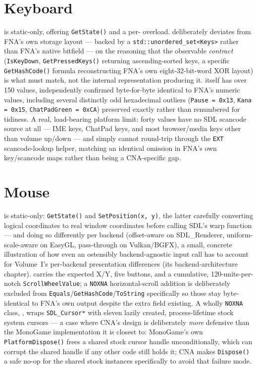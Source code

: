 \section{Keyboard}

 is static-only, offering \texttt{GetState()} and a
per- overload.  deliberately deviates from
FNA's own storage layout --- backed by a \texttt{std::unordered\_set<Keys>} rather than
FNA's native bitfield --- on the reasoning that the observable \emph{contract}
(\texttt{IsKeyDown}, \texttt{GetPressedKeys()} returning ascending-sorted keys, a specific
\texttt{GetHashCode()} formula reconstructing FNA's own eight-32-bit-word XOR layout) is what
must match, not the internal representation producing it.  itself has over
150 values, independently confirmed byte-for-byte identical to FNA's numeric values,
including several distinctly odd hexadecimal outliers (\texttt{Pause = 0x13},
\texttt{Kana = 0x15}, \texttt{ChatPadGreen = 0xCA}) preserved exactly rather than renumbered
for tidiness. A real, load-bearing platform limit: forty  values have no SDL
scancode source at all --- IME keys, ChatPad keys, and most browser/media keys other than
volume up/down --- and simply cannot round-trip through the \texttt{EXT} scancode-lookup
helper, matching an identical omission in FNA's own key/scancode maps rather than being a
CNA-specific gap.

\section{Mouse}

 is static-only: \texttt{GetState()} and \texttt{SetPosition(x, y)}, the
latter carefully converting logical coordinates to real window coordinates before calling
SDL's warp function --- and doing so differently per backend (offset-aware on SDL\_Renderer,
uniform-scale-aware on EasyGL, pass-through on Vulkan/BGFX), a small, concrete illustration of
how even an ostensibly backend-agnostic input call has to account for
Volume~I's per-backend presentation differences (its backend-architecture chapter).
 carries the expected X/Y, five buttons, and a cumulative,
120-units-per-notch \texttt{ScrollWheelValue}; a \texttt{NOXNA} horizontal-scroll addition is
deliberately excluded from \texttt{Equals}/\texttt{GetHashCode}/\texttt{ToString} specifically
so those stay byte-identical to FNA's own output despite the extra field existing. A wholly
\texttt{NOXNA} class, , wraps \texttt{SDL\_Cursor*} with eleven lazily
created, process-lifetime stock system cursors --- a case where CNA's design is deliberately
\emph{more} defensive than the MonoGame implementation it is closest to: MonoGame's own
\texttt{PlatformDispose()} frees a shared stock cursor handle unconditionally, which can
corrupt the shared handle if any other code still holds it; CNA makes \texttt{Dispose()} a
safe no-op for the shared stock instances specifically to avoid that failure mode.

